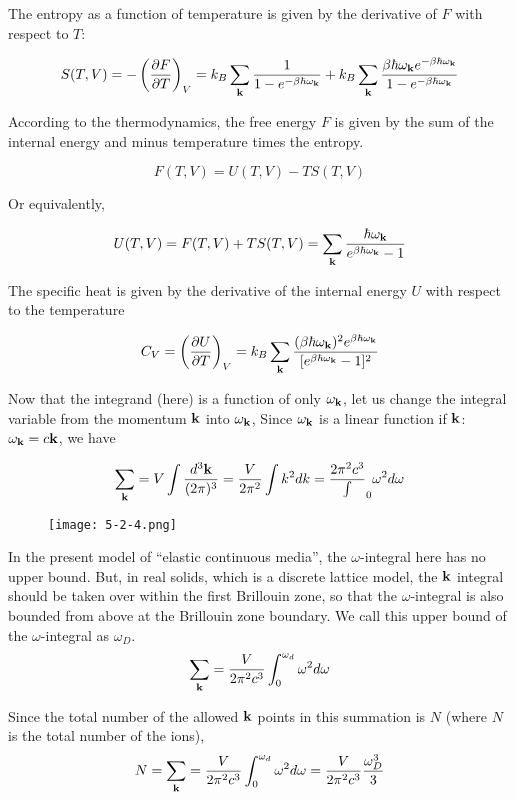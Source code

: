 The entropy as a function of temperature is given by the derivative of $F$ with respect to $T$: 

\[S(T,V) = -\left(\frac{\partial F}{\partial T}\right)_V = k_B\sum_{\bf k}\frac{1}{1-e^{-\beta\hbar\omega_{\bf k}}} + k_B\sum_{\bf k}\frac{\beta\hbar\omega_{\bf k}e^{-\beta\hbar\omega_{\bf k}}}{1-e^{-\beta\hbar\omega_{\bf k}}} \]

According to the thermodynamics, the free energy $F$ is given by the sum of the internal energy and minus temperature times the entropy. 

\[F(T,V) = U(T,V) - TS(T,V) \]

Or equivalently, 

\[U(T,V) = F(T,V) +TS(T,V) = \sum_{\bf k}\frac{\hbar\omega_{\bf k}}{e^{\beta\hbar\omega_{\bf k}} - 1} \]

The specific heat is given by the derivative of the internal energy $U$ with respect to the temperature 

\[C_V = \left(\frac{\partial U}{\partial T}\right)_V = k_B\sum_{\bf k}\frac{({\beta\hbar\omega_{\bf k}})^2e^{\beta\hbar\omega_{\bf k}}}{[e^{\beta\hbar\omega_{\bf k}} - 1]^2} \]

Now that the integrand (here) is a function of only $\omega_{\bf k}$, let us change the integral variable from the momentum ${\bf k}$ into $\omega_{\bf k}$, Since $\omega_{\bf k}$ is a linear function if $\bf k$: $\omega_{\bf k} = c\bf k$, we have

\[\sum_{\bf k} = V\int\frac{d^3\bf k}{(2\pi)^3} = \frac{V}{2\pi^2}\int k^2dk = \frac{2\pi^2c^3}\int_0 \omega^2d\omega \]

\begin{wrapfigure}{l}{6cm}
\texttt{[image: 5-2-4.png]}
\end{wrapfigure}In the present model of ``elastic continuous media'', the $\omega$-integral here has no upper bound. But, in real solids, which is a discrete lattice model, the $\bf k$ integral should be taken over within the first Brillouin zone, so that the $\omega$-integral is also bounded from above at the Brillouin zone boundary. We call this upper bound of the $\omega$-integral as $\omega_D$. 
\[\sum_{\bf k} = \frac{V}{2\pi^2c^3}\int_0^{\omega_d}\omega^2d\omega \]

Since the total number of the allowed $\bf k$ points in this summation is $N$ (where $N$ is the total number of the ions), 
\[N = \sum_{\bf k} = \frac{V}{2\pi^2c^3}\int_0^{\omega_d}\omega^2d\omega = \frac{V}{2\pi^2c^3}\frac{\omega_D^3}{3} \]

